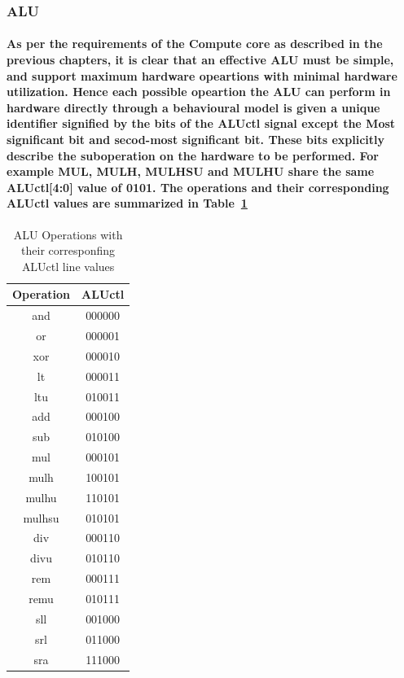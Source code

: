 \documentclass[12pt,a4paper]{report}
\begin{document}
\subsubsection{ALU}
\paragraph{\textrm{\textmd{As per the requirements of the Compute core as described in the previous chapters, it is clear that an effective ALU must be simple, and support maximum hardware opeartions with minimal hardware utilization. Hence each possible opeartion the ALU can perform in hardware directly through a behavioural model is given a unique identifier signified by the bits of the \textbf{ALUctl} signal except the Most significant bit and secod-most significant bit. These bits explicitly describe the suboperation on the hardware to be performed. For example  MUL, MULH, MULHSU and MULHU share the same \textbf{ALUctl[4:0]} value of 0101. The operations and their corresponding \textbf{ALUctl} values are summarized in Table~\ref{tab:alu}}}}
\begin{table}[h!t]
	\centering
\begin{tabular}{|c|c|}
		\hline
		\rowcolor[HTML]{34CDF9} 
		Operation & ALUctl \\ [1.5ex] \hline 
		and       & 000000 \\ \hline
		or        & 000001 \\ \hline
		xor       & 000010 \\ \hline
		lt        & 000011 \\ \hline
		ltu       & 010011 \\ \hline
		add       & 000100 \\ \hline
		sub       & 010100 \\ \hline
		mul       & 000101 \\ \hline
		mulh      & 100101 \\ \hline
		mulhu     & 110101 \\ \hline
		mulhsu    & 010101 \\ \hline
		div       & 000110 \\ \hline
		divu      & 010110 \\ \hline
		rem       & 000111 \\ \hline
		remu      & 010111 \\ \hline
		sll       & 001000 \\ \hline
		srl       & 011000 \\ \hline
		sra       & 111000 \\ \hline
\end{tabular}
	\caption{ALU Operations with their corresponfing ALUctl line values}
	\label{tab:alu}
\end{table}
\end{document}
